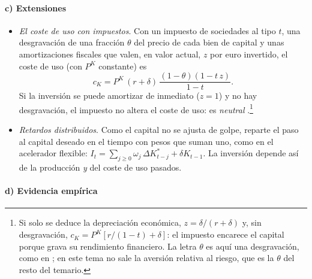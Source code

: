 \documentclass[11pt]{article}
\begin{document}
\paragraph{c) Extensiones}

\begin{itemize}
\item \emph{El coste de uso con impuestos}\nocite{HallJorgenson1967Tax}. Con un impuesto de sociedades al tipo $t$, una desgravación de una fracción $\theta$ del precio de cada bien de capital y unas amortizaciones fiscales que valen, en valor actual, $z$ por euro invertido, el coste de uso (con $P^K$ constante) es
  \begin{equation*}
  c_K=P^K\,(r+\delta)\,\frac{(1-\theta)(1-t\,z)}{1-t}.
  \end{equation*}
  Si la inversión se puede amortizar de inmediato ($z=1$) y no hay desgravación, el impuesto no altera el coste de uso: es \emph{neutral} .\footnote{Si solo se deduce la depreciación económica, $z=\delta/(r+\delta)$ y, sin desgravación, $c_K=P^K\left[r/(1-t)+\delta\right]$: el impuesto encarece el capital porque grava su rendimiento financiero. La letra $\theta$ es aquí una desgravación, como en \textcite{Romer2019Advanced}; en este tema no sale la aversión relativa al riesgo, que es la $\theta$ del resto del temario.}
\item \emph{Retardos distribuidos}. Como el capital no se ajusta de golpe,  reparte el paso al capital deseado en el tiempo con pesos que suman uno, como en el acelerador flexible: $I_t=\sum_{j\ge 0}\omega_j\,\Delta K^*_{t-j}+\delta K_{t-1}$. La inversión depende así de la producción \emph{y} del coste de uso pasados.
\end{itemize}

\paragraph{d) Evidencia empírica}
\end{document}
